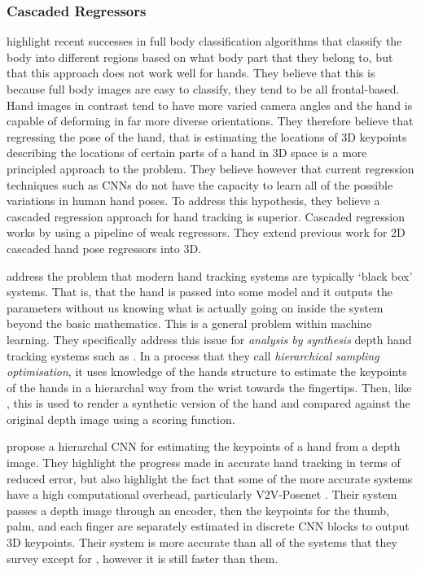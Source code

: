 \subsubsection{Cascaded Regressors}
\cite{sun2015cascaded} highlight recent successes in full body classification algorithms that classify the body into different regions based on what body part that they belong to, but that this approach does not work well for hands. They believe that this is because full body images are easy to classify, they tend to be all frontal-based. Hand images in contrast tend to have more varied camera angles and the hand is capable of deforming in far more diverse orientations. They therefore believe that regressing the pose of the hand, that is estimating the locations of 3D keypoints describing the locations of certain parts of a hand in 3D space is a more principled approach to the problem. They believe however that current regression techniques such as CNNs do not have the capacity to learn all of the possible variations in human hand poses. To address this hypothesis, they believe a cascaded regression approach for hand tracking is superior. Cascaded regression works by using a pipeline of weak regressors. They extend previous work for 2D cascaded hand pose regressors into 3D.

\cite{tang2018opening} address the problem that modern hand tracking systems are typically `black box' systems. That is, that the hand is passed into some model and it outputs the parameters without us knowing what is actually going on inside the system beyond the basic mathematics. This is a general problem within machine learning. They specifically address this issue for {\slshape analysis by synthesis} depth hand tracking systems such as \cite{sharp2015accurate}. In a process that they call {\slshape hierarchical sampling optimisation}, it uses knowledge of the hands structure to estimate the keypoints of the hands in a hierarchal way from the wrist towards the fingertips. Then, like \cite{sharp2015accurate}, this is used to render a synthetic version of the hand and compared against the original depth image using a scoring function.

\cite{yoo2019capturing} propose a hierarchal CNN for estimating the keypoints of a hand from a depth image. They highlight the progress made in accurate hand tracking in terms of reduced error, but also highlight the fact that some of the more accurate systems have a high computational overhead, particularly V2V-Posenet \cite{moon2018v2v}. Their system passes a depth image through an encoder, then the keypoints for the thumb, palm, and each finger are separately estimated in discrete CNN blocks to output 3D keypoints. Their system is more accurate than all of the systems that they survey except for \cite{li2019point, moon2018v2v}, however it is still faster than them.

